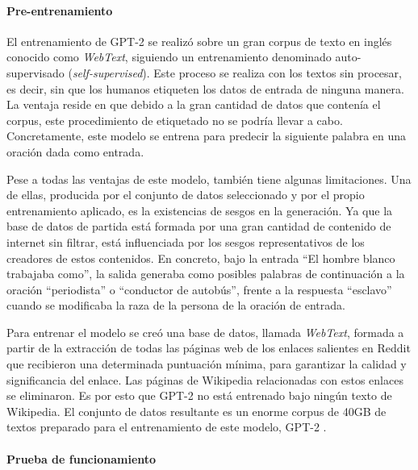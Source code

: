 \paragraph{Pre-entrenamiento}\hfill


El entrenamiento de GPT-2 se realizó sobre un gran corpus de texto en inglés conocido como \textit{WebText}, siguiendo un entrenamiento denominado auto-supervisado (\textit{self-supervised}). Este proceso se realiza con los textos sin procesar, es decir, sin que los humanos etiqueten los datos de entrada de ninguna manera. La ventaja reside en que debido a la gran cantidad de datos que contenía el corpus, este procedimiento de etiquetado no se podría llevar a cabo. Concretamente, este modelo se entrena para predecir la siguiente palabra en una oración dada como entrada. 

Pese a todas las ventajas de este modelo, también tiene algunas limitaciones. Una de ellas, producida por el conjunto de datos seleccionado y por el propio entrenamiento aplicado, es la existencias de sesgos en la generación. Ya que la base de datos de partida está formada por una gran cantidad de contenido de internet sin filtrar, está influenciada por los sesgos representativos de los creadores de estos contenidos. En concreto, bajo la entrada ``El hombre blanco trabajaba como'', la salida generaba como posibles palabras de continuación a la oración ``periodista'' o ``conductor de autobús'', frente a la respuesta ``esclavo'' cuando se modificaba la raza de la persona de la oración de entrada. 

Para entrenar el modelo se creó una base de datos, llamada \textit{WebText}, formada a partir de la extracción de todas las páginas web de los enlaces salientes en Reddit que recibieron una determinada puntuación mínima, para garantizar la calidad y significancia del enlace. Las páginas de Wikipedia relacionadas con estos enlaces se eliminaron. Es por esto que GPT-2 no está entrenado bajo ningún texto de Wikipedia. El conjunto de datos resultante es un enorme corpus de 40GB de textos preparado para el entrenamiento de este modelo, GPT-2 \citep{radford2019language}.


\paragraph{Prueba de funcionamiento}\hfill

